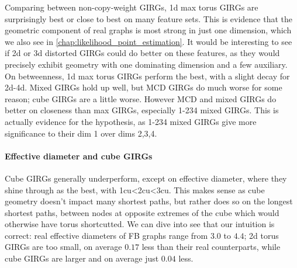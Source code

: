 Comparing between non-copy-weight GIRGs, 1d max torus GIRGs are surprisingly best or close to best on many feature sets. This is evidence that the geometric component of real graphs is most strong in just one dimension, which we also see in \cref{chap:likelihood_point_estimation}. It would be interesting to see if 2d or 3d distorted GIRGs could do better on these features, as they would precisely exhibit geometry with one dominating dimension and a few auxiliary.
On betweenness, 1d max torus GIRGs perform the best, with a slight decay for 2d-4d. Mixed GIRGs hold up well, but MCD GIRGs do much worse for some reason; cube GIRGs are a little worse.
However MCD and mixed GIRGs do better on closeness than max GIRGs, especially 1-234 mixed GIRGs. This is actually evidence for the  hypothesis, as 1-234 mixed GIRGs give more significance to their dim 1 over dims 2,3,4.  

\paragraph{Effective diameter and cube GIRGs}
Cube GIRGs generally underperform, except on effective diameter, where they shine through as the best, with 1cu\textless 2cu\textless 3cu. This makes sense as cube geometry doesn't impact many shortest paths, but rather does so on the longest shortest paths, between nodes at opposite extremes of the cube which would otherwise have torus shortcutted. We can dive into see that our intuition is correct: real effective diameters of FB graphs range from $3.0$ to $4.4$; 2d torus GIRGs are too small, on average $0.17$ less than their real counterparts, while cube GIRGs are larger and on average just $0.04$ less.





